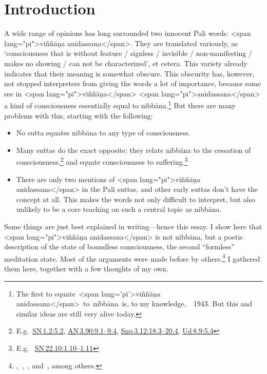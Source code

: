 \documentclass[10pt, openright]{book}
\begin{document}
\chapter{Introduction}
A wide range of opinions has long surrounded two innocent Pali words: <span lang="pi">viññāṇa anidassana</span>. They are translated variously, as ‘consciousness that is without feature / signless / invisible / non-manifesting / makes no showing / can not be characterized’, et cetera. This variety already indicates that their meaning is somewhat obscure. This obscurity has, however, not stopped interpreters from giving the words a lot of importance, because some see in <span lang="pi">viññāṇa</span> <span lang="pi">anidassana</span> a kind of consciousness essentially equal to nibbāna.\footnote {The first to equate <span lang='pi'>viññāṇa anidassana</span> to nibbāna is, to my knowledge, \cite{Falk} 1943. But this and similar ideas are still very alive today.} But there are many problems with this, starting with the following:


\begin{itemize}

\itemsep5pt\parskip0pt


\item
No sutta equates nibbāna to any type of consciousness.



\item
Many suttas do the exact opposite: they relate nibbāna to the cessation of consciousness,\footnote {E.g. \href{https://suttacentral.net/sn1.2/en/sujato\#5.2}{SN 1.2:5.2}, \href{https://suttacentral.net/an3.90/en/sujato\#9.1}{AN 3.90:9.1–9.4}, \href{https://suttacentral.net/snp3.12/en/sujato\#18.3}{Snp 3.12:18.3–20.4}, \href{https://suttacentral.net/ud8.9/en/sujato\#5.4}{Ud 8.9:5.4}} and equate consciousness to suffering.\footnote {E.g.  \href{https://suttacentral.net/sn22.10/en/sujato\#1.10}{SN 22.10:1.10–1.11}}



\item
There are only two mentions of <span lang="pi">viññāṇa anidassana</span> in the Pali suttas, and other early suttas don’t have the concept at all. This makes the words not only difficult to interpret, but also unlikely to be a core teaching on such a central topic as nibbāna.





\end{itemize}
Some things are just best explained in writing—hence this essay. I show here that <span lang="pi">viññāṇa anidassana</span> is not nibbāna, but a poetic description of the state of boundless consciousness, the second “formless” meditation state. Most of the arguments were made before by others.\footnote {\cite{Anālayo 2017}, \cite{Brahmali}, \cite{Sujato 2011a}, and \cite{Sujato 2011b}, among others.} I gathered them here, together with a few thoughts of my own.
\end{document}
